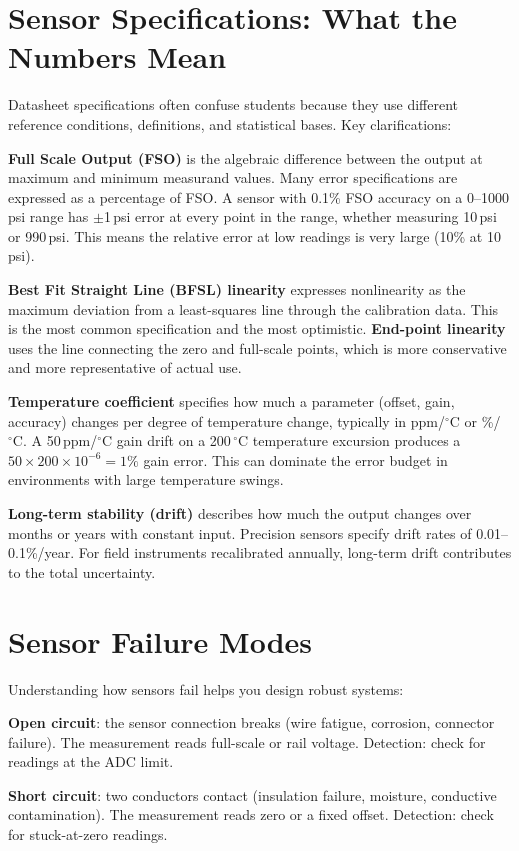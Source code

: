\documentclass[11pt,letterpaper,twoside,openany]{book}
\newcommand{\degC}{\ensuremath{{}^{\circ}\text{C}}}
\begin{document}
\section{Sensor Specifications: What the Numbers Mean}
Datasheet specifications often confuse students because they use different reference conditions, definitions, and statistical bases. Key clarifications:

\textbf{Full Scale Output (FSO)} is the algebraic difference between the output at maximum and minimum measurand values. Many error specifications are expressed as a percentage of FSO. A sensor with 0.1\% FSO accuracy on a 0--1000\,psi range has $\pm$1\,psi error at every point in the range, whether measuring 10\,psi or 990\,psi. This means the relative error at low readings is very large (10\% at 10\,psi).

\textbf{Best Fit Straight Line (BFSL) linearity} expresses nonlinearity as the maximum deviation from a least-squares line through the calibration data. This is the most common specification and the most optimistic. \textbf{End-point linearity} uses the line connecting the zero and full-scale points, which is more conservative and more representative of actual use.

\textbf{Temperature coefficient} specifies how much a parameter (offset, gain, accuracy) changes per degree of temperature change, typically in ppm/\degC{} or \%/\degC{}. A 50\,ppm/\degC{} gain drift on a 200\,\degC{} temperature excursion produces a $50 \times 200 \times 10^{-6} = 1\%$ gain error. This can dominate the error budget in environments with large temperature swings.

\textbf{Long-term stability (drift)} describes how much the output changes over months or years with constant input. Precision sensors specify drift rates of 0.01--0.1\%/year. For field instruments recalibrated annually, long-term drift contributes to the total uncertainty.

\section{Sensor Failure Modes}
Understanding how sensors fail helps you design robust systems:

\textbf{Open circuit}: the sensor connection breaks (wire fatigue, corrosion, connector failure). The measurement reads full-scale or rail voltage. Detection: check for readings at the ADC limit.

\textbf{Short circuit}: two conductors contact (insulation failure, moisture, conductive contamination). The measurement reads zero or a fixed offset. Detection: check for stuck-at-zero readings.
\end{document}
